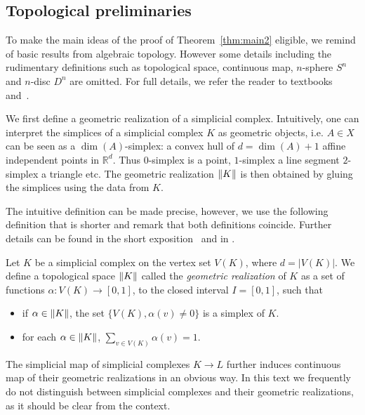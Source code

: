 \documentclass[a4paper, v2021]{lipics-v2021}
\theoremstyle{plain}
\theoremstyle{definition}
\DeclarePairedDelimiter{\gr}{\lVert}{\rVert}
\begin{document}
\subsection*{Topological preliminaries}
To make the main ideas of the proof of Theorem~\ref{thm:main2} eligible, we remind of basic results from algebraic topology. However some details including the rudimentary definitions such as topological space, continuous map, $n$-sphere $S^n$ and $n$-disc $D^n$ are omitted. For full details, we refer the reader to textbooks~\cite{Hatcher2002,Kozlov2008CAT} and~\cite{matousek2003}.

We first define a geometric realization of a simplicial complex. Intuitively, one can interpret the simplices of a simplicial complex $K$ as geometric objects, i.e. $A\in X$ can be seen as a $\dim(A)$-simplex: a convex hull of $d = \dim(A) + 1$ affine independent points in $\mathbb{R}^d$. Thus $0$-simplex is a point, $1$-simplex a line segment $2$-simplex a triangle etc. The geometric realization $\gr{K}$ is then obtained by gluing the simplices using the data from $K$. 

The intuitive definition can be made precise, however, we use the following definition that is shorter and remark that both definitions coincide. Further details can be found in the short exposition~\cite{nLabscpx} and in \cite[Section~1.3]{matousek2003}.

\begin{definition}
Let $K$ be a simplicial complex on the vertex set $V(K)$, where $d = |V(K)|$. We define a topological space $\gr{K}$ called the \emph{geometric realization} of $K$ as a set of functions $\alpha \colon V(K) \to [0,1]$, to the closed interval $I = [0,1]$, such that
\begin{itemize}
    \item if $\alpha \in \gr{K}$, the set $\{V(K), \alpha(v)\neq 0\}$ is a simplex of $K$.
    \item for each $\alpha \in \gr{K}$,  $\sum_{v \in V(K)} \alpha(v) = 1$.
\end{itemize}
\end{definition}
The simplicial map of simplicial complexes $K \to L$ further induces continuous map of their geometric realizations in an obvious way. In this text we frequently do not distinguish between simplicial complexes and their geometric realizations, as it should be clear from the context.
\end{document}
